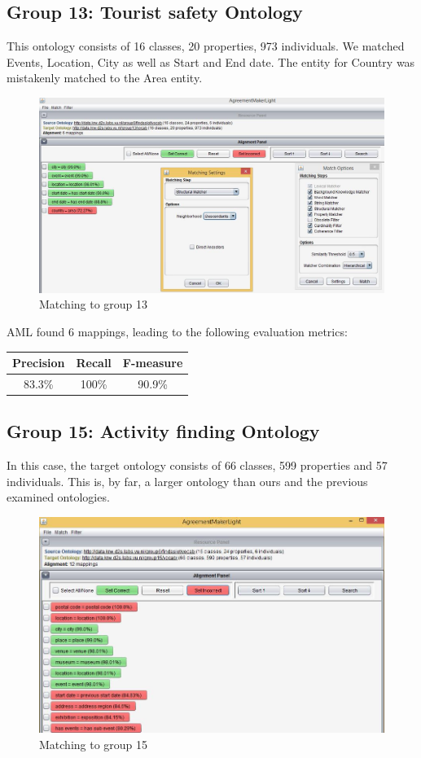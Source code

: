 \documentclass[runningheads,a4paper]{../../StyleFiles/llncs}
\begin{document}
\subsection{Group 13: Tourist safety Ontology}
This ontology consists of 16 classes, 20 properties, 973 individuals. We matched Events, Location, City as well as Start and End date. The entity for Country was mistakenly matched to the Area entity.

\begin{figure}[h]\centering
	\includegraphics[width=.7\textwidth]{img/match_g13.png}
	\caption{Matching to group 13}
	\label{fig:match_g13}
\end{figure}

AML found 6 mappings, leading to the following evaluation metrics: 

\begin{center}
	\begin{tabular}{| c | c | c |}
		\hline
		\textbf{Precision} & \textbf{Recall} & \textbf{F-measure} \\ \hline
		83.3\% & 100\% & 90.9\% \\ \hline
	\end{tabular}
\end{center}

\subsection{Group 15: Activity finding Ontology}
In this case, the target ontology consists of 66 classes, 599 properties and 57 individuals. This is, by far, a larger ontology than ours and the previous examined ontologies. 

\begin{figure}[h]\centering
	\includegraphics[width=.7\textwidth]{img/match_g15.png}
	\caption{Matching to group 15}
	\label{fig:match_g15}
\end{figure}
\end{document}

